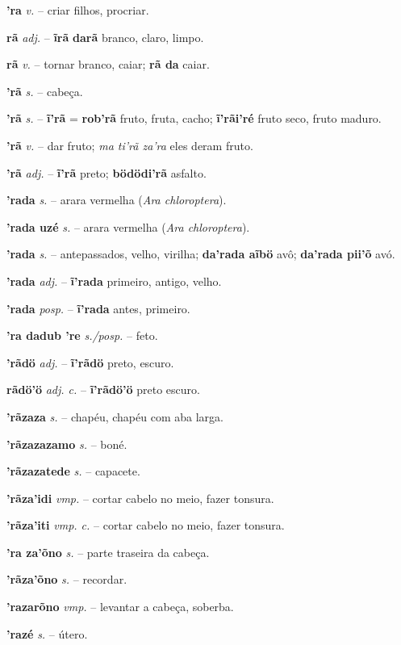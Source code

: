 \textbf{'ra} \textit{v.} -- criar filhos, procriar.

\textbf{rã} \textit{adj.} -- \textbf{ĩrã} \textbf{darã} branco, claro, limpo.

\textbf{rã} \textit{v.} -- tornar branco, caiar; \textbf{rã da} caiar.

\textbf{'rã} \textit{s.} -- cabeça.

\textbf{'rã} \textit{s.} -- \textbf{ĩ'rã} = \textbf{rob'rã} fruto, fruta, cacho; \textbf{ĩ'rãi'ré} fruto seco, fruto maduro.

\textbf{'rã} \textit{v.} -- dar fruto; \textit{ma ti'rã za'ra} eles deram fruto.

\textbf{'rã} \textit{adj.} -- \textbf{ĩ'rã} preto; \textbf{bödödi'rã} asfalto.

\textbf{'rada} \textit{s.} -- arara vermelha (\textit{Ara chloroptera}).

\textbf{'rada uzé} \textit{s.} -- arara vermelha (\textit{Ara chloroptera}).

\textbf{'rada} \textit{s.} -- antepassados, velho, virilha; \textbf{da'rada aĩbö} avô; \textbf{da'rada pii'õ} avó.

\textbf{'rada} \textit{adj.} -- \textbf{ĩ'rada} primeiro, antigo, velho.

\textbf{'rada} \textit{posp.} -- \textbf{ĩ'rada} antes, primeiro.

\textbf{'ra dadub 're} \textit{s./posp.} -- feto.

\textbf{'rãdö} \textit{adj.} -- \textbf{ĩ'rãdö} preto, escuro.

\textbf{rãdö'ö} \textit{adj. c.} -- \textbf{ĩ'rãdö'ö} preto escuro.

\textbf{'rãzaza} \textit{s.} -- chapéu, chapéu com aba larga.

\textbf{'rãzazazamo} \textit{s.} -- boné.

\textbf{'rãzazatede} \textit{s.} -- capacete.

\textbf{'rãza'idi} \textit{vmp.} -- cortar cabelo no meio, fazer tonsura.

\textbf{'rãza'iti} \textit{vmp. c.} -- cortar cabelo no meio, fazer tonsura.

\textbf{'ra za'õno} \textit{s.} -- parte traseira da cabeça.

\textbf{'rãza'õno} \textit{s.} -- recordar.

\textbf{'razarõno} \textit{vmp.} -- levantar a cabeça, soberba.

\textbf{'razé} \textit{s.} -- útero.

